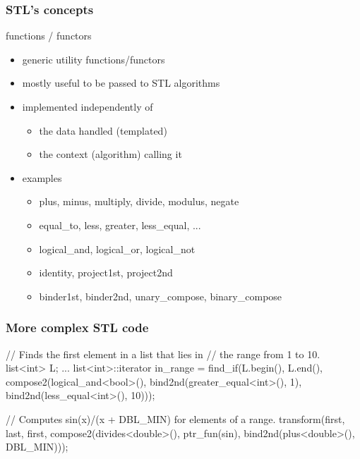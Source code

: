 \begin{frame}[fragile]
  \frametitle{STL's concepts}
  \begin{block}{functions / functors}
    \begin{itemize}
      \item generic utility functions/functors
      \item mostly useful to be passed to STL algorithms
    \item implemented independently of
      \begin{itemize}
      \item the data handled (templated)
      \item the context (algorithm) calling it
      \end{itemize}
    \item examples
      \begin{itemize}
      \item plus, minus, multiply, divide, modulus, negate
      \item equal\_to, less, greater, less\_equal, ...
      \item logical\_and, logical\_or, logical\_not
      \item identity, project1st, project2nd
      \item binder1st, binder2nd, unary\_compose, binary\_compose
      \end{itemize}
    \end{itemize}
  \end{block}
\end{frame}


\begin{frame}[fragile]
  \frametitle{More complex STL code}
  \begin{cppcode}
    // Finds the first element in a list that lies in
    // the range from 1 to 10.
    list<int> L;
    ...
    list<int>::iterator in_range = 
      find_if(L.begin(), L.end(),
              compose2(logical_and<bool>(),
                       bind2nd(greater_equal<int>(), 1),
                       bind2nd(less_equal<int>(), 10)));

    // Computes sin(x)/(x + DBL_MIN) for elements of a range.
    transform(first, last, first,
              compose2(divides<double>(),
                       ptr_fun(sin),
                       bind2nd(plus<double>(), DBL_MIN)));
  \end{cppcode}
\end{frame}

